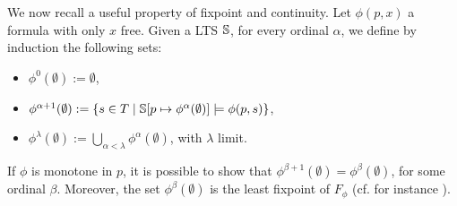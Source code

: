 %
%
%

We now recall a useful property of fixpoint and continuity. Let $\phi(p,x)$ a formula with only $x$ free.
Given a LTS $\mathbb{S}$, for every ordinal $\alpha$, we define by induction the following sets:
\begin{itemize}
	 pt
	\item $\phi^0(\emptyset):= \emptyset$,
	\item $\phi^{\alpha+1}(\emptyset):= \{ s \in T \mid \mathbb{S}[p \mapsto \phi^\alpha(\emptyset)] \models \phi(p, s)\}$,
	\item $\phi^{\lambda}(\emptyset):= \bigcup_{\alpha < \lambda} \phi^{\alpha}(\emptyset)$, with $\lambda$ limit.
\end{itemize}
If $\phi$ is monotone in $p$, it is possible to show that $\phi^{\beta+1}(\emptyset)= \phi^{\beta}(\emptyset)$, for some ordinal $\beta$. Moreover, the set $\phi^{\beta}(\emptyset)$ is the least fixpoint of $F_\phi$ (cf. for instance \cite{ArnoldN01}).



